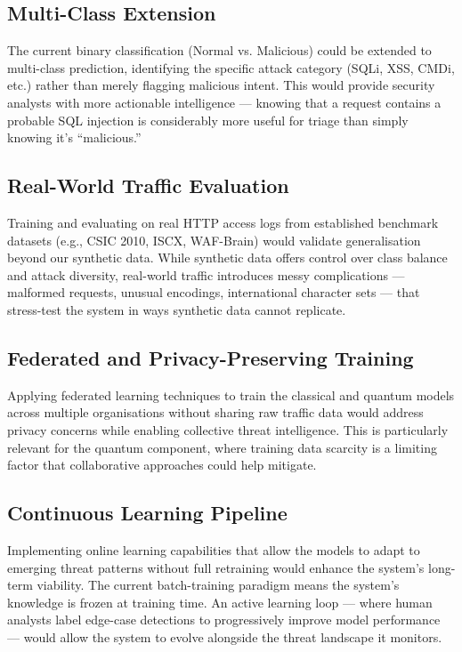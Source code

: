 \documentclass[journal,onecolumn]{IEEEtran}
\begin{document}
\subsection{Multi-Class Extension}
The current binary classification (Normal vs. Malicious) could be extended to multi-class prediction, identifying the specific attack category (SQLi, XSS, CMDi, etc.) rather than merely flagging malicious intent. This would provide security analysts with more actionable intelligence --- knowing that a request contains a probable SQL injection is considerably more useful for triage than simply knowing it's ``malicious.''

\subsection{Real-World Traffic Evaluation}
Training and evaluating on real HTTP access logs from established benchmark datasets (e.g., CSIC 2010, ISCX, WAF-Brain) would validate generalisation beyond our synthetic data. While synthetic data offers control over class balance and attack diversity, real-world traffic introduces messy complications --- malformed requests, unusual encodings, international character sets --- that stress-test the system in ways synthetic data cannot replicate.

\subsection{Federated and Privacy-Preserving Training}
Applying federated learning techniques to train the classical and quantum models across multiple organisations without sharing raw traffic data would address privacy concerns while enabling collective threat intelligence. This is particularly relevant for the quantum component, where training data scarcity is a limiting factor that collaborative approaches could help mitigate.

\subsection{Continuous Learning Pipeline}
Implementing online learning capabilities that allow the models to adapt to emerging threat patterns without full retraining would enhance the system's long-term viability. The current batch-training paradigm means the system's knowledge is frozen at training time. An active learning loop --- where human analysts label edge-case detections to progressively improve model performance --- would allow the system to evolve alongside the threat landscape it monitors.
\end{document}
